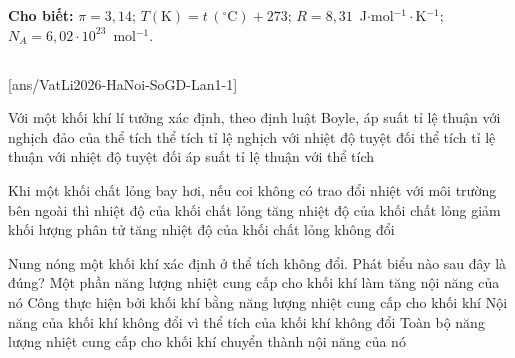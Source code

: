 \def\CheDo{solcolor}%
\def\tenchuong{Sở GD\&ĐT Hà Nội -- Lần 1}
\def\thuonghieu{VẬT LÍ 12 -- Eduzy.com.vn}
\def\TachCauDS{1}
\def\TachCauLG{1}




	\noindent\textbf{Cho biết:} $\pi=3{,}14$; $T(\text{K})=t\,(^\circ\text{C})+273$; $R=8{,}31$~J$\cdot$mol$^{-1}\cdot$K$^{-1}$; $N_A=6{,}02\cdot 10^{23}$~mol$^{-1}$.

	\noindent
	\subsection*{}
	\setcounter{ex}{0}
	[ans/VatLi2026-HaNoi-SoGD-Lan1-1]

	\begin{ex}%
		Với một khối khí lí tưởng xác định, theo định luật Boyle,
		\choice
		{\True áp suất tỉ lệ thuận với nghịch đảo của thể tích}
		{thể tích tỉ lệ nghịch với nhiệt độ tuyệt đối}
		{thể tích tỉ lệ thuận với nhiệt độ tuyệt đối}
		{áp suất tỉ lệ thuận với thể tích}
	\end{ex}

	\begin{ex}%
		Khi một khối chất lỏng bay hơi, nếu coi không có trao đổi nhiệt với môi trường bên ngoài thì
		\choice
		{nhiệt độ của khối chất lỏng tăng}
		{\True nhiệt độ của khối chất lỏng giảm}
		{khối lượng phân tử tăng}
		{nhiệt độ của khối chất lỏng không đổi}
	\end{ex}

	\begin{ex}%
		Nung nóng một khối khí xác định ở thể tích không đổi. Phát biểu nào sau đây là đúng?
		\choice
		{Một phần năng lượng nhiệt cung cấp cho khối khí làm tăng nội năng của nó}
		{Công thực hiện bởi khối khí bằng năng lượng nhiệt cung cấp cho khối khí}
		{Nội năng của khối khí không đổi vì thể tích của khối khí không đổi}
		{\True Toàn bộ năng lượng nhiệt cung cấp cho khối khí chuyển thành nội năng của nó}
	\end{ex}


